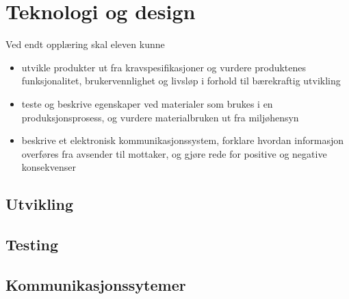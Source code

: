 \documentclass[main.tex]{subfiles}
\begin{document}
\section{Teknologi og design}
Ved endt opplæring skal eleven kunne
\begin{itemize}[noitemsep]
\item utvikle produkter ut fra kravspesifikasjoner og vurdere produktenes funksjonalitet, brukervennlighet og livsløp i forhold til bærekraftig utvikling
\item teste og beskrive egenskaper ved materialer som brukes i en produksjonsprosess, og vurdere materialbruken ut fra miljøhensyn
\item beskrive et elektronisk kommunikasjonssystem, forklare hvordan informasjon overføres fra avsender til mottaker, og gjøre rede for positive og negative konsekvenser
\end{itemize}

\subsection{Utvikling}

\subsection{Testing}

\subsection{Kommunikasjonssytemer}
\end{document}
